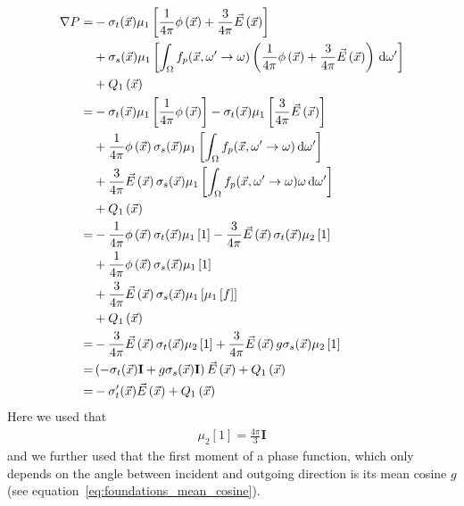 \begin{align*}
\nabla P =&
-\sigma_t(\vec{x})\mu_1\left[\frac{1}{4\pi}\phi\left(\vec{x}\right) + \frac{3}{4\pi}\vec{E}\left(\vec{x}\right)\right]
\\&
+\sigma_s(\vec{x})\mu_1\left[\int_{\Omega}f_p(\vec{x}, \omega'\rightarrow\omega)\left(\frac{1}{4\pi}\phi\left(\vec{x}\right) + \frac{3}{4\pi}\vec{E}\left(\vec{x}\right)\right)\,\mathrm{d}\omega'\right]
\\&
\nonumber
+ Q_1\left(\vec{x}\right)
\\
=&
-\sigma_t(\vec{x})\mu_1\left[\frac{1}{4\pi}\phi\left(\vec{x}\right)\right]
-\sigma_t(\vec{x})\mu_1\left[\frac{3}{4\pi}\vec{E}\left(\vec{x}\right)\right]
\\
&
+\frac{1}{4\pi}\phi\left(\vec{x}\right)\sigma_s(\vec{x})\mu_1\left[\int_{\Omega}f_p(\vec{x}, \omega'\rightarrow\omega)\,\mathrm{d}\omega'\right]
\\
&
+\frac{3}{4\pi}\vec{E}\left(\vec{x}\right)\sigma_s(\vec{x})\mu_1\left[\int_{\Omega}f_p(\vec{x}, \omega'\rightarrow\omega)\omega\,\mathrm{d}\omega'\right]
\\
&
+Q_1\left(\vec{x}\right)
\\
=&
-\frac{1}{4\pi}\phi\left(\vec{x}\right)\sigma_t(\vec{x})\mu_1\left[1\right]
-\frac{3}{4\pi}\vec{E}\left(\vec{x}\right)\sigma_t(\vec{x})\mu_2\left[1\right]
\\
&
+\frac{1}{4\pi}\phi\left(\vec{x}\right)\sigma_s(\vec{x})\mu_1\left[1\right]
\\
&
+\frac{3}{4\pi}\vec{E}\left(\vec{x}\right)\sigma_s(\vec{x})\mu_1\left[\mu_1\left[f\right]\right]
\\
&
+Q_1\left(\vec{x}\right)
\\
=&
-\frac{3}{4\pi}\vec{E}\left(\vec{x}\right)\sigma_t(\vec{x})\mu_2\left[1\right]
+\frac{3}{4\pi}\vec{E}\left(\vec{x}\right)g\sigma_s(\vec{x})\mu_2\left[1\right]
\\
=&
\left(-\sigma_t(\vec{x})\mathbf{I} + g\sigma_s(\vec{x})\mathbf{I}\right)\vec{E}\left(\vec{x}\right)
+Q_1\left(\vec{x}\right)
\\
=&
-\sigma_t'(\vec{x})\vec{E}\left(\vec{x}\right)
+Q_1\left(\vec{x}\right)
\end{align*}
Here we used that
\begin{align*}
\mu_2[1] = \frac{4\pi}{3}\mathbf{I}
\end{align*}
and we further used that the first moment of a phase function, which only depends on the angle between incident and outgoing direction is its mean cosine $g$ (see equation~\ref{eq:foundations_mean_cosine}).

